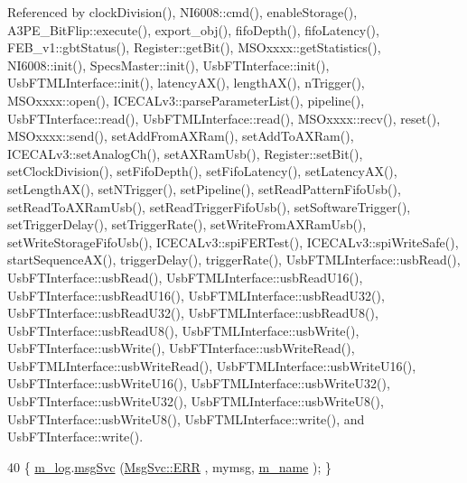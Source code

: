 Referenced by clock\+Division(), N\+I6008\+::cmd(), enable\+Storage(), A3\+P\+E\+\_\+\+Bit\+Flip\+::execute(), export\+\_\+obj(), fifo\+Depth(), fifo\+Latency(), F\+E\+B\+\_\+v1\+::gbt\+Status(), Register\+::get\+Bit(), M\+S\+Oxxxx\+::get\+Statistics(), N\+I6008\+::init(), Specs\+Master\+::init(), Usb\+F\+T\+Interface\+::init(), Usb\+F\+T\+M\+L\+Interface\+::init(), latency\+A\+X(), length\+A\+X(), n\+Trigger(), M\+S\+Oxxxx\+::open(), I\+C\+E\+C\+A\+Lv3\+::parse\+Parameter\+List(), pipeline(), Usb\+F\+T\+Interface\+::read(), Usb\+F\+T\+M\+L\+Interface\+::read(), M\+S\+Oxxxx\+::recv(), reset(), M\+S\+Oxxxx\+::send(), set\+Add\+From\+A\+X\+Ram(), set\+Add\+To\+A\+X\+Ram(), I\+C\+E\+C\+A\+Lv3\+::set\+Analog\+Ch(), set\+A\+X\+Ram\+Usb(), Register\+::set\+Bit(), set\+Clock\+Division(), set\+Fifo\+Depth(), set\+Fifo\+Latency(), set\+Latency\+A\+X(), set\+Length\+A\+X(), set\+N\+Trigger(), set\+Pipeline(), set\+Read\+Pattern\+Fifo\+Usb(), set\+Read\+To\+A\+X\+Ram\+Usb(), set\+Read\+Trigger\+Fifo\+Usb(), set\+Software\+Trigger(), set\+Trigger\+Delay(), set\+Trigger\+Rate(), set\+Write\+From\+A\+X\+Ram\+Usb(), set\+Write\+Storage\+Fifo\+Usb(), I\+C\+E\+C\+A\+Lv3\+::spi\+F\+E\+R\+Test(), I\+C\+E\+C\+A\+Lv3\+::spi\+Write\+Safe(), start\+Sequence\+A\+X(), trigger\+Delay(), trigger\+Rate(), Usb\+F\+T\+M\+L\+Interface\+::usb\+Read(), Usb\+F\+T\+Interface\+::usb\+Read(), Usb\+F\+T\+M\+L\+Interface\+::usb\+Read\+U16(), Usb\+F\+T\+Interface\+::usb\+Read\+U16(), Usb\+F\+T\+M\+L\+Interface\+::usb\+Read\+U32(), Usb\+F\+T\+Interface\+::usb\+Read\+U32(), Usb\+F\+T\+M\+L\+Interface\+::usb\+Read\+U8(), Usb\+F\+T\+Interface\+::usb\+Read\+U8(), Usb\+F\+T\+M\+L\+Interface\+::usb\+Write(), Usb\+F\+T\+Interface\+::usb\+Write(), Usb\+F\+T\+Interface\+::usb\+Write\+Read(), Usb\+F\+T\+M\+L\+Interface\+::usb\+Write\+Read(), Usb\+F\+T\+M\+L\+Interface\+::usb\+Write\+U16(), Usb\+F\+T\+Interface\+::usb\+Write\+U16(), Usb\+F\+T\+M\+L\+Interface\+::usb\+Write\+U32(), Usb\+F\+T\+Interface\+::usb\+Write\+U32(), Usb\+F\+T\+M\+L\+Interface\+::usb\+Write\+U8(), Usb\+F\+T\+Interface\+::usb\+Write\+U8(), Usb\+F\+T\+M\+L\+Interface\+::write(), and Usb\+F\+T\+Interface\+::write().


\begin{DoxyCode}
40 \{ \hyperlink{classObject_a0d269813dd7ac1f24bc143031e2963f2}{m\_log}.\hyperlink{classMsgSvc_ad25f18047920cc59a314e5098259711c}{msgSvc} (\hyperlink{classMsgSvc_ae671eb7301996cd049d2da8a65925926a35a9d7166e9896af4ec8fb33bf5f1772}{MsgSvc::ERR}     , mymsg, \hyperlink{classObject_a8b83c95c705d2c3ba0d081fe1710f48d}{m\_name} ); \}
\end{DoxyCode}
\mbox{\label{classObject_ad7f6c457733082efa2f9ff5f5c8e119a}} 
